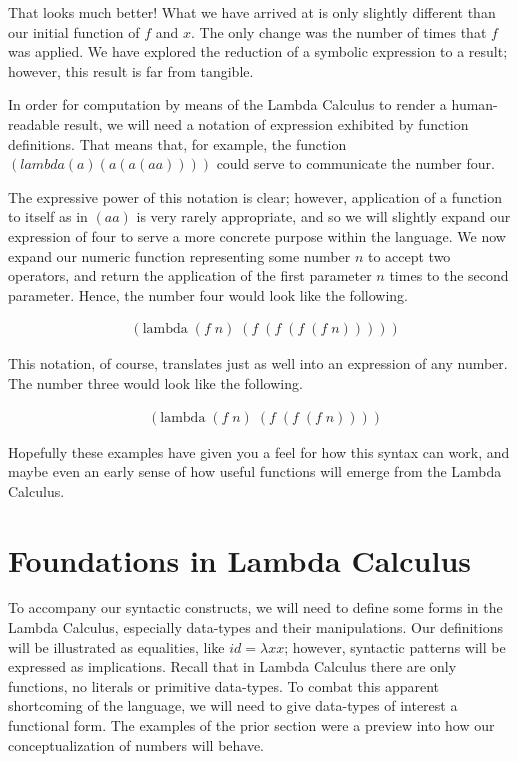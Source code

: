 That looks much better! What we have arrived at is only slightly different than
our initial function of $f$ and $x$. The only change was the number of times that
$f$ was applied. We have explored the reduction of a symbolic expression to a
result; however, this result is far from tangible.

In order for computation by means of the Lambda Calculus to render a 
human-readable result, we will need a notation of expression exhibited by function
definitions. That means that, for example, the function 
$(lambda (a) (a (a (a a))))$ could serve to communicate the number four.

The expressive power of this notation is clear; however, application of a function 
to itself as in $(a a)$ is very rarely appropriate, and so we will slightly expand 
our expression of four to serve a more concrete purpose within the language. We
now expand our numeric function representing some number $n$ to accept two
operators, and return the application of the first parameter $n$ times to the
second parameter. Hence, the number four would look like the following.

\begin{figure}[ht]
\caption{}\label{scheme}
\begin{align*}
& (\text{lambda} \; (f \; n) \; (f \; (f \; (f \; (f \; n)))))
\end{align*}
\end{figure}

This notation, of course, translates just as well into an expression of any
number. The number three would look like the following.

\begin{figure}[ht]
\caption{}\label{scheme}
\begin{align*}
& (\text{lambda} \; (f \; n) \; (f \; (f \; (f \; n))))
\end{align*}
\end{figure}

Hopefully these examples have given you a feel for how this syntax can work, and
maybe even an early sense of how useful functions will emerge from the Lambda
Calculus.

\section{Foundations in Lambda Calculus}
To accompany our syntactic constructs, we will need to define some forms in the
Lambda Calculus, especially data-types and their manipulations. Our definitions
will be illustrated as equalities, like $id = \lambda xx$; however, syntactic
patterns will be expressed as implications. Recall that in Lambda Calculus there
are only functions, no literals or primitive data-types. To combat this apparent
shortcoming of the language, we will need to give data-types of interest a
functional form. The examples of the prior section were a preview into how our
conceptualization of numbers will behave.

